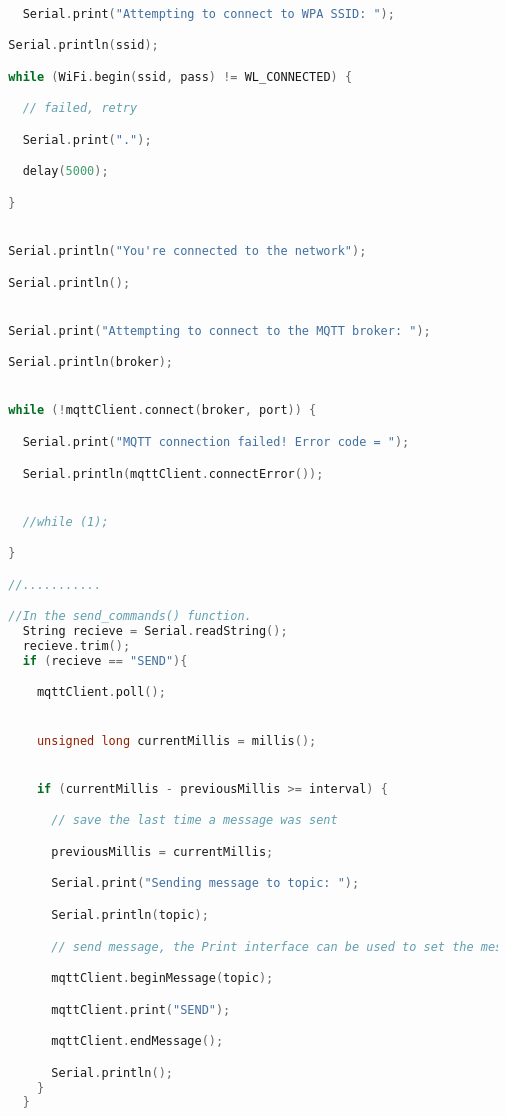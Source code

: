 \documentclass[12pt,a4paper]{article}
\begin{document}
\begin{lstlisting}[language=C, caption=Arduino Client]

    Serial.print("Attempting to connect to WPA SSID: ");

  Serial.println(ssid);

  while (WiFi.begin(ssid, pass) != WL_CONNECTED) {

    // failed, retry

    Serial.print(".");

    delay(5000);

  }


  Serial.println("You're connected to the network");

  Serial.println();


  Serial.print("Attempting to connect to the MQTT broker: ");

  Serial.println(broker);


  while (!mqttClient.connect(broker, port)) {

    Serial.print("MQTT connection failed! Error code = ");

    Serial.println(mqttClient.connectError());


    //while (1);

  }

  //...........

  //In the send_commands() function.
    String recieve = Serial.readString();
    recieve.trim();
    if (recieve == "SEND"){

      mqttClient.poll();


      unsigned long currentMillis = millis();


      if (currentMillis - previousMillis >= interval) {

        // save the last time a message was sent

        previousMillis = currentMillis;

        Serial.print("Sending message to topic: ");

        Serial.println(topic);

        // send message, the Print interface can be used to set the message contents

        mqttClient.beginMessage(topic);

        mqttClient.print("SEND");

        mqttClient.endMessage();

        Serial.println();
      }
    }

\end{lstlisting}
\end{document}
